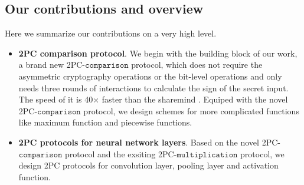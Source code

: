 \documentclass[letterpaper]{article} %
\begin{document}
    \subsection{Our contributions and overview}%
    Here we summarize our contributions on a very high level.


    \begin{itemize}
        \item \textbf{2PC comparison protocol}.
        We begin with the building block of our work, a brand new 2PC-$\mathtt{comparison}$ protocol,
        which does not require the asymmetric cryptography operations or the bit-level operations
        and only needs three rounds of interactions to calculate the sign of the secret input.
        The speed of it is 40$\times$ faster than the sharemind \cite{Sharemind}.
        Equiped with the novel 2PC-$\mathtt{comparison}$ protocol, we design schemes for more complicated functions
        like maximum function and piecewise functions.

        \item \textbf{2PC protocols for neural network layers}.
        Based on the novel 2PC-$\mathtt{comparison}$ protocol and the exsiting 2PC-$\mathtt{multiplication}$ protocol,
        we design 2PC protocols for convolution layer, pooling layer and activation function.







\end{itemize}
\end{document}
